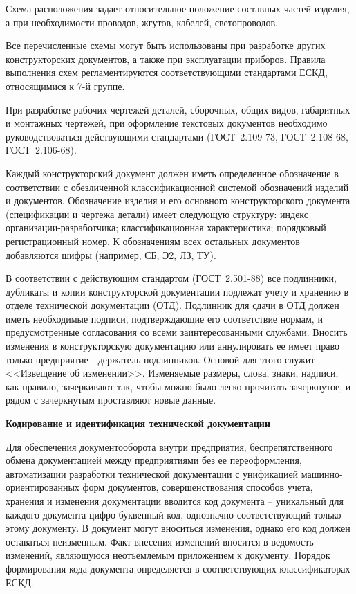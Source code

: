 Схема расположения задает относительное положение составных частей изделия, а при необходимости проводов, жгутов, кабелей, светопроводов.

Все перечисленные схемы могут быть использованы при разработке других конструкторских документов, а также при эксплуатации приборов. Правила выполнения схем регламентируются соответствующими стандартами ЕСКД, относящимися к 7-й группе.

При разработке рабочих чертежей деталей, сборочных, общих видов, габаритных и монтажных чертежей, при оформление текстовых документов необходимо руководствоваться действующими стандартами (ГОСТ~2.109-73, ГОСТ~2.108-68, ГОСТ~2.106-68).

Каждый конструкторский документ должен иметь определенное обозначение в соответствии с обезличенной классификационной системой обозначений изделий и документов. Обозначение изделия и его основного конструкторского документа (спецификации и чертежа детали) имеет следующую структуру: индекс организации-разработчика; классификационная характеристика; порядковый регистрационный номер. К обозначениям всех остальных документов добавляются шифры (например, СБ, Э2, ЛЗ, ТУ).

В соответствии с действующим стандартом (ГОСТ~2.501-88) все подлинники, дубликаты и копии конструкторской документации подлежат учету и хранению в отделе технической документации (ОТД). Подлинник для сдачи в ОТД должен иметь необходимые подписи, подтверждающие его соответствие нормам, и предусмотренные согласования со всеми заинтересованными службами. Вносить изменения в конструкторскую документацию или аннулировать ее имеет право только предприятие - держатель подлинников. Основой для этого служит <<Извещение об изменении>>. Изменяемые размеры, слова, знаки, надписи, как правило, зачеркивают так, чтобы можно было легко прочитать зачеркнутое, и рядом с зачеркнутым проставляют новые данные.

\begin{flushleft}
	\textbf{Кодирование и идентификация технической документации}
\end{flushleft}

Для обеспечения документооборота внутри предприятия, беспрепятственного обмена документацией между предприятиями без ее переоформления, автоматизации разработки технической документации с унификацией машинно-ориентированных форм документов, совершенствования способов учета, хранения и изменения документации вводится код документа -- уникальный для каждого документа цифро-буквенный код, однозначно соответствующий только этому документу. В документ могут вноситься изменения, однако его код должен оставаться неизменным. Факт внесения изменений вносится в ведомость изменений, являющуюся неотъемлемым приложением к документу.
Порядок формирования кода документа определяется в соответствующих классификаторах ЕСКД. 

